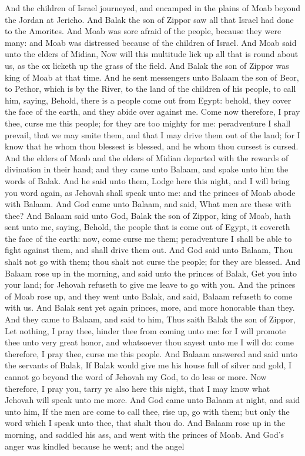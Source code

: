 And the children of Israel journeyed, and encamped in the plains of Moab beyond the Jordan at Jericho.  And Balak the son of Zippor saw all that Israel had done to the Amorites. And Moab was sore afraid of the people, because they were many: and Moab was distressed because of the children of Israel. And Moab said unto the elders of Midian, Now will this multitude lick up all that is round about us, as the ox licketh up the grass of the field. And Balak the son of Zippor was king of Moab at that time. And he sent messengers unto Balaam the son of Beor, to Pethor, which is by the River, to the land of the children of his people, to call him, saying, Behold, there is a people come out from Egypt: behold, they cover the face of the earth, and they abide over against me. Come now therefore, I pray thee, curse me this people; for they are too mighty for me: peradventure I shall prevail, that we may smite them, and that I may drive them out of the land; for I know that he whom thou blessest is blessed, and he whom thou cursest is cursed.  And the elders of Moab and the elders of Midian departed with the rewards of divination in their hand; and they came unto Balaam, and spake unto him the words of Balak. And he said unto them, Lodge here this night, and I will bring you word again, as Jehovah shall speak unto me: and the princes of Moab abode with Balaam. And God came unto Balaam, and said, What men are these with thee? And Balaam said unto God, Balak the son of Zippor, king of Moab, hath sent unto me, saying, Behold, the people that is come out of Egypt, it covereth the face of the earth: now, come curse me them; peradventure I shall be able to fight against them, and shall drive them out. And God said unto Balaam, Thou shalt not go with them; thou shalt not curse the people; for they are blessed. And Balaam rose up in the morning, and said unto the princes of Balak, Get you into your land; for Jehovah refuseth to give me leave to go with you. And the princes of Moab rose up, and they went unto Balak, and said, Balaam refuseth to come with us.  And Balak sent yet again princes, more, and more honorable than they. And they came to Balaam, and said to him, Thus saith Balak the son of Zippor, Let nothing, I pray thee, hinder thee from coming unto me: for I will promote thee unto very great honor, and whatsoever thou sayest unto me I will do: come therefore, I pray thee, curse me this people. And Balaam answered and said unto the servants of Balak, If Balak would give me his house full of silver and gold, I cannot go beyond the word of Jehovah my God, to do less or more. Now therefore, I pray you, tarry ye also here this night, that I may know what Jehovah will speak unto me more. And God came unto Balaam at night, and said unto him, If the men are come to call thee, rise up, go with them; but only the word which I speak unto thee, that shalt thou do.  And Balaam rose up in the morning, and saddled his ass, and went with the princes of Moab. And God’s anger was kindled because he went; and the angel 